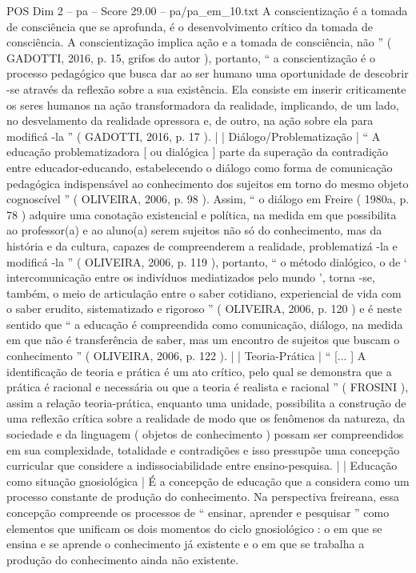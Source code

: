 \begin{textsample}{POS Dim 2 – pa – Score 29.00 – pa/pa\_em\_10.txt}
A conscientização é a tomada de consciência que se aprofunda, é o desenvolvimento crítico da tomada de consciência.
A conscientização implica ação e a tomada de consciência, não ” ( GADOTTI, 2016, p. 15, grifos do autor ), portanto, “ a conscientização é o processo pedagógico que busca dar ao ser humano uma oportunidade de descobrir -se através da reflexão sobre a sua existência.
Ela consiste em inserir criticamente os seres humanos na ação transformadora da realidade, implicando, de um lado, no desvelamento da realidade opressora e, de outro, na ação sobre ela para modificá -la ” ( GADOTTI, 2016, p. 17 ). | | Diálogo/Problematização | “ A educação problematizadora [ ou dialógica ] parte da superação da contradição entre educador-educando, estabelecendo o diálogo como forma de comunicação pedagógica indispensável ao conhecimento dos sujeitos em torno do mesmo objeto cognoscível ” ( OLIVEIRA, 2006, p. 98 ).
Assim, “ o diálogo em Freire ( 1980a, p. 78 ) adquire uma conotação existencial e política, na medida em que possibilita ao professor(a) e ao aluno(a) serem sujeitos não só do conhecimento, mas da história e da cultura, capazes de compreenderem a realidade, problematizá -la e modificá -la ” ( OLIVEIRA, 2006, p. 119 ), portanto, “ o método dialógico, o de ‘ intercomunicação entre os indivíduos mediatizados pelo mundo ’, torna -se, também, o meio de articulação entre o saber cotidiano, experiencial de vida com o saber erudito, sistematizado e rigoroso ” ( OLIVEIRA, 2006, p. 120 ) e é neste sentido que “ a educação é compreendida como comunicação, diálogo, na medida em que não é transferência de saber, mas um encontro de sujeitos que buscam o conhecimento ” ( OLIVEIRA, 2006, p. 122 ). | | Teoria-Prática | “ [... ] A identificação de teoria e prática é um ato crítico, pelo qual se demonstra que a prática é racional e necessária ou que a teoria é realista e racional ” ( FROSINI ), assim a relação teoria-prática, enquanto uma unidade, possibilita a construção de uma reflexão crítica sobre a realidade de modo que os fenômenos da natureza, da sociedade e da linguagem ( objetos de conhecimento ) possam ser compreendidos em sua complexidade, totalidade e contradições e isso pressupõe uma concepção curricular que considere a indissociabilidade entre ensino-pesquisa. | | Educação como situação gnosiológica | É a concepção de educação que a considera como um processo constante de produção do conhecimento.
Na perspectiva freireana, essa concepção compreende os processos de “ ensinar, aprender e pesquisar ” como elementos que unificam os dois momentos do ciclo gnosiológico : o em que se ensina e se aprende o conhecimento já existente e o em que se trabalha a produção do conhecimento ainda não existente.

\end{textsample}
